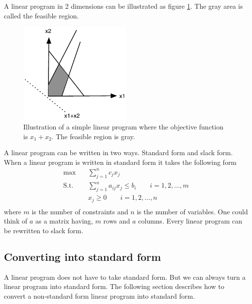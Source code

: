 \documentclass[10pt]{article}
\begin{document}
A linear program in 2 dimensions can be illustrated as figure \ref{fig3}. The gray area is called the feasible region.
\begin{figure}[ht]
\centering
\includegraphics[width=0.5\textwidth]{figures/fig3.pdf}
\caption{Illustration of a simple linear program where the objective function is $x_1 + x_2$. The feasible region is gray.}
\label{fig3}
\end{figure}

A linear program can be written in two ways. Standard form and slack form. When a linear program is written in standard form it takes the following form
\begin{align*}
\max &\quad \sum_{j=1}^n c_jx_j  \\ 
 \text{S.t.} &\quad \sum_{j=1}^n a_{ij}x_j \leq b_i \qquad i=1,2,\ldots,m\\
             &\quad x_j \geq 0 \qquad i=1,2,\ldots,n\\
\end{align*}
where $m$ is the number of constraints and $n$ is the number of variables. One could think of $a$ as a matrix having, $m$ rows and $a$ columns. Every linear program can be rewritten to slack form. 

\subsection{Converting into standard form} %
\label{sub:converting_into_standard_form}
A linear program does not have to take standard form. But we can always turn a linear program into standard form. The following section describes how to convert a non-standard form linear program into standard form.
\end{document}
